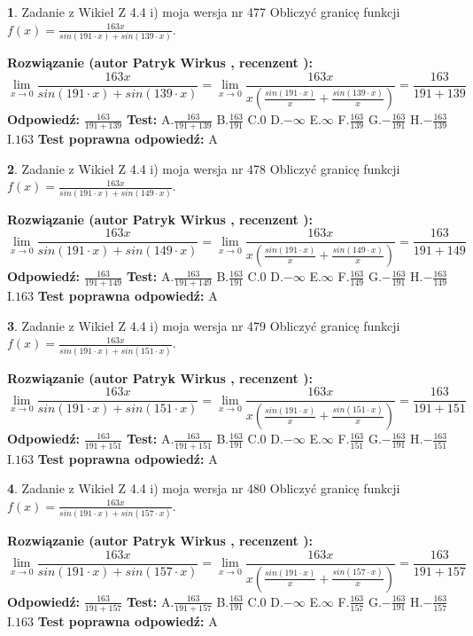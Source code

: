\documentclass[12pt, a4paper]{article}
\theoremstyle{definition} %
\newtheorem{zad}{}
\newcommand{\zadStart}[1]{\begin{zad}#1\newline}
\newcommand{\zadStop}{\end{zad}}
\newcommand{\rozwStart}[2]{\noindent \textbf{Rozwiązanie (autor #1 , recenzent #2): }\newline}
\newcommand{\rozwStop}{\newline}
\newcommand{\odpStart}{\noindent \textbf{Odpowiedź:}\newline}
\newcommand{\odpStop}{\newline}
\newcommand{\testStart}{\noindent \textbf{Test:}\newline}
\newcommand{\testStop}{\newline}
\newcommand{\kluczStart}{\noindent \textbf{Test poprawna odpowiedź:}\newline}
\newcommand{\kluczStop}{\newline}
\begin{document}
\zadStart{Zadanie z Wikieł Z 4.4 i) moja wersja nr 477}
Obliczyć granicę funkcji $f(x)=\frac{163x}{sin(191\cdot x) +sin(139\cdot x)}$.
\zadStop
\rozwStart{Patryk Wirkus}{}
$$\lim\limits_{x\to 0}\frac{163x}{sin(191\cdot x) +sin(139\cdot x)}=\lim\limits_{x\to 0}\frac{163x}{x(\frac{sin(191\cdot x)}{x}+\frac{sin(139\cdot x)}{x})}=\frac{163}{191+139}$$
\rozwStop
\odpStart
$\frac{163}{191+139}$
\odpStop
\testStart
A.$\frac{163}{191+139}$
B.$\frac{163}{191}$
C.$0$
D.$-\infty$
E.$\infty$
F.$\frac{163}{139}$
G.$-\frac{163}{191}$
H.$-\frac{163}{139}$
I.$163$
\testStop
\kluczStart
A
\kluczStop



\zadStart{Zadanie z Wikieł Z 4.4 i) moja wersja nr 478}
Obliczyć granicę funkcji $f(x)=\frac{163x}{sin(191\cdot x) +sin(149\cdot x)}$.
\zadStop
\rozwStart{Patryk Wirkus}{}
$$\lim\limits_{x\to 0}\frac{163x}{sin(191\cdot x) +sin(149\cdot x)}=\lim\limits_{x\to 0}\frac{163x}{x(\frac{sin(191\cdot x)}{x}+\frac{sin(149\cdot x)}{x})}=\frac{163}{191+149}$$
\rozwStop
\odpStart
$\frac{163}{191+149}$
\odpStop
\testStart
A.$\frac{163}{191+149}$
B.$\frac{163}{191}$
C.$0$
D.$-\infty$
E.$\infty$
F.$\frac{163}{149}$
G.$-\frac{163}{191}$
H.$-\frac{163}{149}$
I.$163$
\testStop
\kluczStart
A
\kluczStop



\zadStart{Zadanie z Wikieł Z 4.4 i) moja wersja nr 479}
Obliczyć granicę funkcji $f(x)=\frac{163x}{sin(191\cdot x) +sin(151\cdot x)}$.
\zadStop
\rozwStart{Patryk Wirkus}{}
$$\lim\limits_{x\to 0}\frac{163x}{sin(191\cdot x) +sin(151\cdot x)}=\lim\limits_{x\to 0}\frac{163x}{x(\frac{sin(191\cdot x)}{x}+\frac{sin(151\cdot x)}{x})}=\frac{163}{191+151}$$
\rozwStop
\odpStart
$\frac{163}{191+151}$
\odpStop
\testStart
A.$\frac{163}{191+151}$
B.$\frac{163}{191}$
C.$0$
D.$-\infty$
E.$\infty$
F.$\frac{163}{151}$
G.$-\frac{163}{191}$
H.$-\frac{163}{151}$
I.$163$
\testStop
\kluczStart
A
\kluczStop



\zadStart{Zadanie z Wikieł Z 4.4 i) moja wersja nr 480}
Obliczyć granicę funkcji $f(x)=\frac{163x}{sin(191\cdot x) +sin(157\cdot x)}$.
\zadStop
\rozwStart{Patryk Wirkus}{}
$$\lim\limits_{x\to 0}\frac{163x}{sin(191\cdot x) +sin(157\cdot x)}=\lim\limits_{x\to 0}\frac{163x}{x(\frac{sin(191\cdot x)}{x}+\frac{sin(157\cdot x)}{x})}=\frac{163}{191+157}$$
\rozwStop
\odpStart
$\frac{163}{191+157}$
\odpStop
\testStart
A.$\frac{163}{191+157}$
B.$\frac{163}{191}$
C.$0$
D.$-\infty$
E.$\infty$
F.$\frac{163}{157}$
G.$-\frac{163}{191}$
H.$-\frac{163}{157}$
I.$163$
\testStop
\kluczStart
A
\kluczStop
\end{document}
